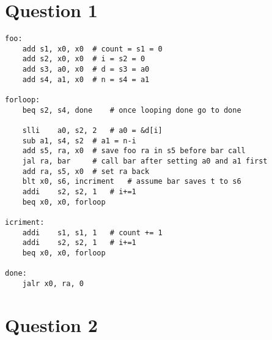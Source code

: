 \documentclass[12pt,letterpaper]{article}
\begin{document}
\section*{Question 1}

     \begin{lstlisting}[style = Python]
foo:
	add	s1, x0, x0	# count = s1 = 0
	add	s2, x0, x0	# i = s2 = 0
	add	s3, a0, x0	# d = s3 = a0
	add	s4, a1, x0	# n = s4 = a1
	
forloop:
	beq	s2, s4, done	# once looping done go to done
	
	slli	a0, s2, 2	# a0 = &d[i]
	sub	a1, s4, s2	# a1 = n-i
	add	s5, ra, x0	# save foo ra in s5 before bar call
	jal	ra, bar		# call bar after setting a0 and a1 first
	add	ra, s5, x0	# set ra back
	blt	x0, s6, incriment	# assume bar saves t to s6
	addi	s2, s2, 1	# i+=1
	beq	x0, x0, forloop

icriment:
	addi	s1, s1, 1	# count += 1
	addi	s2, s2, 1	# i+=1
	beq	x0, x0, forloop
	
done:
	jalr x0, ra, 0

 \end{lstlisting}

\newpage

\section*{Question 2}
\end{document}
